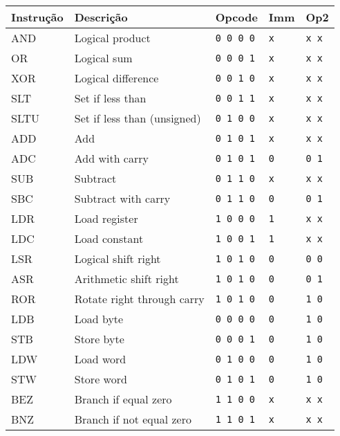 \documentclass{extreport}
\begin{document}
\begin{table}[ht!]
\centering
\begin{tabular}{|p{2.5cm}|p{5.6cm}|p{1.6cm}|p{1.1cm}|p{1.6cm}|}
\hline
\bf{Instrução} 					& \bf{Descrição} & \bf{Opcode} & \bf{Imm} & \bf{Op2} \\ \hline \hline
AND & Logical product 				& \texttt{0 0 0 0} & \texttt{x} & \texttt{x x} \\ \hline
OR & Logical sum 				& \texttt{0 0 0 1} & \texttt{x} & \texttt{x x} \\ \hline
XOR & Logical difference 			& \texttt{0 0 1 0} & \texttt{x} & \texttt{x x} \\ \hline
SLT & Set if less than 				& \texttt{0 0 1 1} & \texttt{x} & \texttt{x x} \\ \hline
SLTU & Set if less than (unsigned) 		& \texttt{0 1 0 0} & \texttt{x} & \texttt{x x} \\ \hline
ADD & Add 					& \texttt{0 1 0 1} & \texttt{x} & \texttt{x x} \\ \hline
ADC & Add with carry				& \texttt{0 1 0 1} & \texttt{0} & \texttt{0 1} \\ \hline
SUB & Subtract 					& \texttt{0 1 1 0} & \texttt{x} & \texttt{x x} \\ \hline
SBC & Subtract with carry			& \texttt{0 1 1 0} & \texttt{0} & \texttt{0 1} \\ \hline
LDR & Load register 				& \texttt{1 0 0 0} & \texttt{1} & \texttt{x x} \\ \hline
LDC & Load constant 				& \texttt{1 0 0 1} & \texttt{1} & \texttt{x x} \\ \hline
LSR & Logical shift right			& \texttt{1 0 1 0} & \texttt{0} & \texttt{0 0} \\ \hline
ASR & Arithmetic shift right			& \texttt{1 0 1 0} & \texttt{0} & \texttt{0 1} \\ \hline
ROR & Rotate right through carry			& \texttt{1 0 1 0} & \texttt{0} & \texttt{1 0} \\ \hline
LDB & Load byte 				& \texttt{0 0 0 0} & \texttt{0} & \texttt{1 0} \\ \hline
STB & Store byte 				& \texttt{0 0 0 1} & \texttt{0} & \texttt{1 0} \\ \hline
LDW & Load word 				& \texttt{0 1 0 0} & \texttt{0} & \texttt{1 0} \\ \hline
STW & Store word 				& \texttt{0 1 0 1} & \texttt{0} & \texttt{1 0} \\ \hline
BEZ & Branch if equal zero 			& \texttt{1 1 0 0} & \texttt{x} & \texttt{x x} \\ \hline
BNZ & Branch if not equal zero 			& \texttt{1 1 0 1} & \texttt{x} & \texttt{x x} \\ \hline
\end{tabular}
\end{table}
\end{document}
